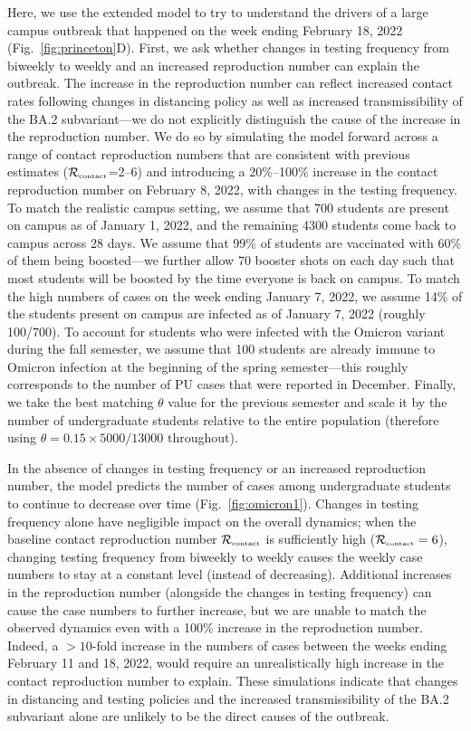 \documentclass[12pt]{article}
\newcommand{\fref}[1]{Fig.~\ref{fig:#1}}
\newcommand{\Rx}[1]{\ensuremath{{\mathcal R}_{#1}}}
\newcommand{\Rc}{\Rx{\textrm{\tiny{contact}}}}
\begin{document}
Here, we use the extended model to try to understand the drivers of a large campus outbreak that happened on the week ending February 18, 2022 (\fref{princeton}D).
First, we ask whether changes in testing frequency from biweekly to weekly and an increased reproduction number can explain the outbreak. 
The increase in the reproduction number can reflect increased contact rates following changes in distancing policy as well as increased transmissibility of the BA.2 subvariant---we do not explicitly distinguish the cause of the increase in the reproduction number. 
We do so by simulating the model forward across a range of contact reproduction numbers that are consistent with previous estimates ($\Rc$=2--6) and introducing a 20\%--100\% increase in the contact reproduction number on February 8, 2022, with changes in the testing frequency.
To match the realistic campus setting, we assume that 700 students are present on campus as of January 1, 2022, and the remaining 4300 students come back to campus across 28 days.
We assume that 99\% of students are vaccinated with 60\% of them being boosted---we further allow 70 booster shots on each day such that most students will be boosted by the time everyone is back on campus.
To match the high numbers of cases on the week ending January 7, 2022, we assume 14\% of the students present on campus are infected as of January 7, 2022 (roughly 100/700).
To account for students who were infected with the Omicron variant during the fall semester, we assume that 100 students are already immune to Omicron infection at the beginning of the spring semester---this roughly corresponds to the number of PU cases that were reported in December.
Finally, we take the best matching $\theta$ value for the previous semester and scale it by the number of undergraduate students relative to the entire population (therefore using $\theta = 0.15 \times 5000/13000$ throughout).

In the absence of changes in testing frequency or an increased reproduction number, the model predicts the number of cases among undergraduate students to continue to decrease over time (\fref{omicron1}).
Changes in testing frequency alone have negligible impact on the overall dynamics; when the baseline contact reproduction number $\Rc$ is sufficiently high ($\Rc = 6$), changing testing frequency from biweekly to weekly causes the weekly case numbers to stay at a constant level (instead of decreasing).
Additional increases in the reproduction number (alongside the changes in testing frequency) can cause the case numbers to further increase, but we are unable to match the observed dynamics even with a 100\% increase in the reproduction number.
Indeed, a $>10$-fold increase in the numbers of cases between the weeks ending February 11 and 18, 2022, would require an unrealistically high increase in the contact reproduction number to explain.
These simulations indicate that changes in distancing and testing policies and the increased transmissibility of the BA.2 subvariant alone are unlikely to be the direct causes of the outbreak.
\end{document}
